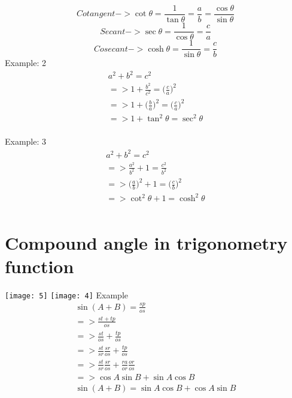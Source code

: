 \begin{equation}
	Cotangent->\cot\theta = \frac{1}{\tan\theta} = \frac{a}{b} = \frac{\cos\theta}{\sin\theta}
\end{equation}
\begin{equation}
	Secant->\sec\theta = \frac{1}{\cos\theta} = \frac{c}{a}
\end{equation}
\begin{equation}
	Cosecant->\cosh\theta = \frac{1}{\sin\theta}=\frac{c}{b}
\end{equation}
\newline
Example: 2
\begin{align}
	a^2+b^2=c^2 \\
	=>1+\frac{b^2}{c^2}=\bigg(\frac{c}{a}\bigg)^2 \\
	=> 1+\bigg(\frac{b}{a}\bigg)^2=\bigg(\frac{c}{a}\bigg)^2 \\
	=> 1+\tan^2\theta = \sec^2\theta \\	
\end{align}

Example: 3
\begin{align}
	a^2+b^2=c^2 \\
	=>\frac{a^2}{b^2}+1 = \frac{c^2}{b^2} \\
	=> \bigg(\frac{a}{b}\bigg)^2+1= \bigg(\frac{c}{b}\bigg)^2 \\
	=> \cot^2\theta+1=\cosh^2\theta \\
\end{align}





\section{Compound angle in trigonometry function}
\texttt{[image: 5]}
\texttt{[image: 4]}
\newline
Example
\begin{align}
	\sin(A+B)=\frac{sp}{os} \\
	=>\frac{st+tp}{os} \\
	=>\frac{st}{os}+\frac{tp}{os} \\
	=>\frac{st}{sr}\frac{sr}{os}+\frac{tp}{os} \\
	=>\frac{st}{sr}\frac{sr}{os}+\frac{ra}{or}\frac{or}{os} \\
	=> \cos A\sin B+\sin A\cos B \\
	\sin(A+B) = \sin A\cos B+\cos A\sin B \\
\end{align}


